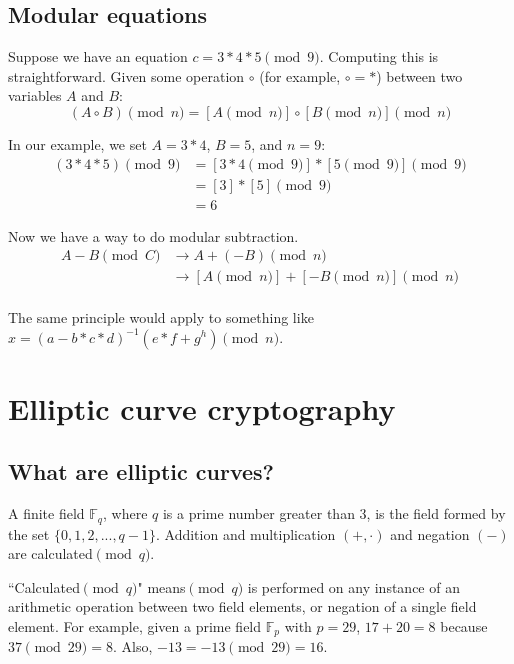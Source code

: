 \subsection{Modular equations}
\label{subsec:modular-equations}

Suppose we have an equation $c = 3*4*5 \pmod 9$. Computing this is straightforward. Given some operation $\circ$ (for example, $\circ = *$) between two variables $A$ and $B$:\vspace{.2cm}
\[ (A \circ B)\pmod{n} = {[A\pmod {n}] \circ [B\pmod{n}]}\pmod{n} \]

In our example, we set $A = 3*4$, $B = 5$, and $n = 9$:\vspace{.2cm}
\begin{align*}
(3*4 * 5) \pmod{9} &= {[3*4 \pmod {9}] * [5 \pmod{9}]} \pmod{9} \\
				   &= [3]*[5] \pmod 9 \\
				   &= 6
\end{align*}

Now we have a way to do modular subtraction.\vspace{.2cm}
\begin{align*}
A - B \pmod C &\rightarrow A + (-B) \pmod n \\
			  &\rightarrow {[A \pmod {n}] + [-B \pmod{n}]} \pmod{n}
\end{align*}\\

The same principle would apply to something like $x = (a-b*c*d)^{-1} (e*f+g^{h}) \pmod n$.



\section{Elliptic curve cryptography}
\label{EllipticCurveCryptography}

\subsection{What are elliptic curves?}
\label{elliptic_curves_section}

A finite field \(\mathbb{F}_q\), where \(q\) is a prime number greater than 3, is the field formed by the set \(\{0, 1, 2, ..., q-1\}\). Addition and multiplication \((+,  \cdot)\) and negation $(-)$ are calculated\( \pmod q\). 

``Calculated\( \pmod q\)" means\( \pmod q\) is performed on any instance of an arithmetic operation between two field elements, or negation of a single field element. For example, given a prime field \(\mathbb{F}_p\) with $p = 29$, $17+20=8$ because $37 \pmod{29} = 8$. Also, $-13 = -13 \pmod{29} = 16$.\\

